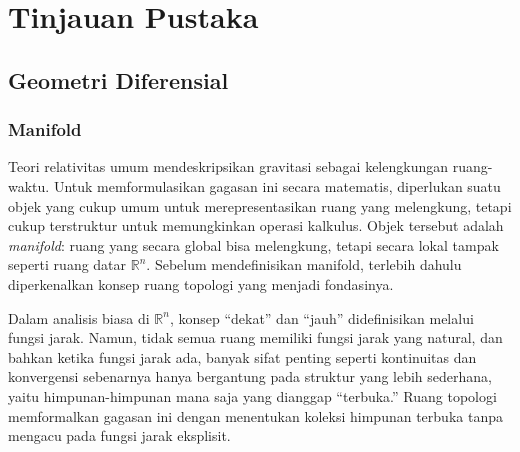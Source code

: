 \chapter{Tinjauan Pustaka}

\section{Geometri Diferensial}
\label{sec:geometri-diferensial}

\subsection{Manifold}
\label{subsec:manifold}

Teori relativitas umum mendeskripsikan gravitasi sebagai kelengkungan ruang-waktu. Untuk memformulasikan gagasan ini secara matematis, diperlukan suatu objek yang cukup umum untuk merepresentasikan ruang yang melengkung, tetapi cukup terstruktur untuk memungkinkan operasi kalkulus. Objek tersebut adalah \textit{manifold}: ruang yang secara global bisa melengkung, tetapi secara lokal tampak seperti ruang datar $\mathbb{R}^n$. Sebelum mendefinisikan manifold, terlebih dahulu diperkenalkan konsep ruang topologi yang menjadi fondasinya.

Dalam analisis biasa di $\mathbb{R}^n$, konsep ``dekat'' dan ``jauh'' didefinisikan melalui fungsi jarak. Namun, tidak semua ruang memiliki fungsi jarak yang natural, dan bahkan ketika fungsi jarak ada, banyak sifat penting seperti kontinuitas dan konvergensi sebenarnya hanya bergantung pada struktur yang lebih sederhana, yaitu himpunan-himpunan mana saja yang dianggap ``terbuka.'' Ruang topologi memformalkan gagasan ini dengan menentukan koleksi himpunan terbuka tanpa mengacu pada fungsi jarak eksplisit.

